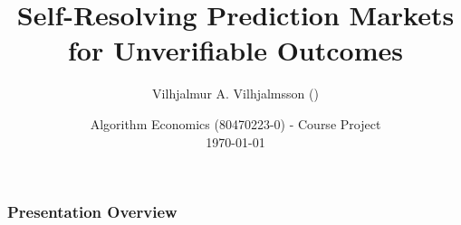 \documentclass[
	11pt, %
]{beamer}
\title[Self-Resolving Prediction markets]{Self-Resolving Prediction Markets for
Unverifiable Outcomes} %
\subtitle{} %
\author[\cn{威廉}]{Vilhjalmur A. Vilhjalmsson (\cn{威廉})} %
\institute[UC]{Tsinghua University \\ \smallskip \textit{weil25@mails.tsinghua.edu.cn}} %
\date[\today]{Algorithm Economics (80470223-0) - Course Project \\ \today} %
\begin{document}

\begin{frame}
	\titlepage %
\end{frame}



\begin{frame}
	\frametitle{Presentation Overview} %
	
	\tableofcontents %
\end{frame}

\end{document}
